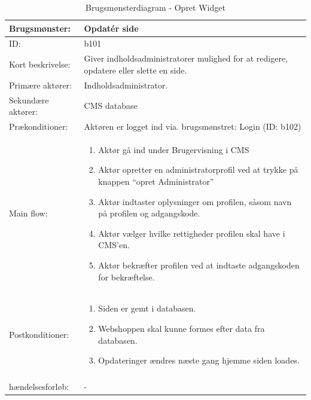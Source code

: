\begin{table}[t]
\centering
    \begin{tabular}{|p{5cm}|p{10cm}|}
        \hline
        Brugsmønster: & Opdatér side \\ 
        \hline
        ID: & b101 \\ 
        \hline
        Kort beskrivelse: & Giver indholdsadministratorer mulighed for at redigere, opdatere eller slette en side. \\ 
        \hline
        Primære aktører: & Indholdsadministrator. \\ 
        \hline
        Sekundære aktører: & CMS database \\ 
        \hline
        Prækonditioner: & Aktøren er logget ind via. brugsmønstret: Login (ID: b102) \\ 
        \hline
        Main flow: & 
        \begin{minipage}{10cm}
        	\begin{enumerate}
                \item Aktør gå ind under Brugervisning i CMS
                \item Aktør opretter en administratorprofil ved at trykke på knappen “opret Administrator”
                \item Aktør indtaster oplysninger om profilen, såsom navn på profilen og adgangskode.
                \item Aktør vælger hvilke rettigheder profilen skal have i CMS’en.
                \item Aktør bekræfter profilen ved at indtaste adgangskoden for bekræftelse.
        	\end{enumerate}
        \end{minipage} \par \\

        \hline
        Postkonditioner: &  
        \begin{minipage}{10cm}
        	\begin{enumerate}
                \item Siden er gemt i databasen.
                \item Webshoppen skal kunne formes efter data fra databasen.
                \item Opdateringer ændres næste gang hjemme siden loades.
        	\end{enumerate}
        \end{minipage} \par \\
        \hline
        \begin{minipage}{3cm} Alternative \\ hændelsesforløb:
        \end{minipage}
        & - \\ 
        \hline
    \end{tabular}
    \caption{Brugsmønsterdiagram - Opret Widget}
    \label{UC-Opret Widget}
\end{table}

